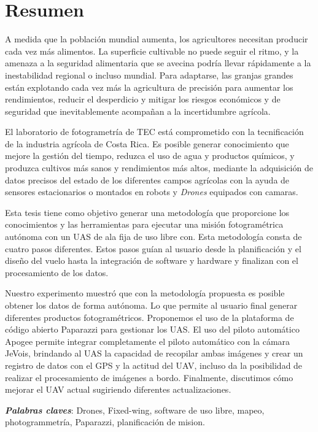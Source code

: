 \section*{Resumen}
A medida que la población mundial aumenta, los agricultores necesitan producir cada vez más alimentos. La superficie cultivable no puede seguir el ritmo, y la amenaza a la seguridad alimentaria que se avecina podría llevar rápidamente a la inestabilidad regional o incluso mundial. Para adaptarse, las granjas grandes están explotando cada vez más la agricultura de precisión para aumentar los rendimientos, reducir el desperdicio y mitigar los riesgos económicos y de seguridad que inevitablemente acompañan a la incertidumbre agrícola.

El laboratorio de fotogrametría de TEC está comprometido con la tecnificación de la industria agrícola de Costa Rica. Es posible generar conocimiento que mejore la gestión del tiempo, reduzca el uso de agua y productos químicos, y produzca cultivos más sanos y rendimientos más altos, mediante la adquisición de datos precisos del estado de los diferentes campos agrícolas con la ayuda de sensores estacionarios o montados en robots y \textit{Drones} equipados con camaras.

Esta tesis tiene como objetivo generar una metodología que proporcione los conocimientos y las herramientas para ejecutar una misión fotogramétrica autónoma con un UAS de ala fija de  uso libre con. Esta metodología consta de cuatro pasos diferentes. Estos pasos guían al usuario desde la planificación y el diseño del vuelo hasta la integración de software y hardware y finalizan con el procesamiento de los datos.

Nuestro experimento muestró que con la metodología propuesta es posible obtener los datos de forma autónoma. Lo que permite al usuario final generar diferentes productos fotogramétricos. Proponemos el uso de la plataforma de código abierto Paparazzi para gestionar los UAS. El uso del piloto automático Apogee permite integrar completamente el piloto automático con la cámara JeVois, brindando al UAS la capacidad de recopilar ambas imágenes y crear un registro de datos con el GPS y la actitud del UAV, incluso da la posibilidad de realizar el procesamiento de imágenes a bordo.
Finalmente, discutimos cómo mejorar el UAV actual sugiriendo diferentes actualizaciones.

\textbf{\textit{Palabras claves}}: Drones, Fixed-wing, software de uso libre, mapeo, photogrammetría, Paparazzi, planificación de mision.